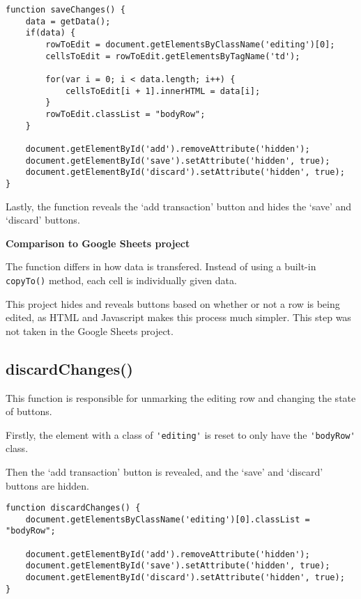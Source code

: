 \documentclass[letterpaper]{article}
\begin{document}
\begin{lstlisting}[firstnumber=197]
function saveChanges() {
    data = getData();
    if(data) {
        rowToEdit = document.getElementsByClassName('editing')[0];
        cellsToEdit = rowToEdit.getElementsByTagName('td');

        for(var i = 0; i < data.length; i++) {
            cellsToEdit[i + 1].innerHTML = data[i];
        }
        rowToEdit.classList = "bodyRow";
    }

    document.getElementById('add').removeAttribute('hidden');
    document.getElementById('save').setAttribute('hidden', true);
    document.getElementById('discard').setAttribute('hidden', true);
}
\end{lstlisting}

Lastly, the function reveals the `add transaction' button and hides the `save' and `discard' buttons.

\textbf{Comparison to Google Sheets project}

The function differs in how data is transfered.
Instead of using a built-in \lstinline{copyTo()} method, each cell is individually given data.

This project hides and reveals buttons based on whether or not a row is being edited, as HTML and Javascript makes this process much simpler.
This step was not taken in the Google Sheets project.

\subsection{discardChanges()}

This function is responsible for unmarking the editing row and changing the state of buttons.

Firstly, the element with a class of \lstinline{'editing'} is reset to only have the \lstinline{'bodyRow'} class.

Then the `add transaction' button is revealed, and the `save' and `discard' buttons are hidden.

\begin{lstlisting}[firstnumber=214]
function discardChanges() {
    document.getElementsByClassName('editing')[0].classList = "bodyRow";

    document.getElementById('add').removeAttribute('hidden');
    document.getElementById('save').setAttribute('hidden', true);
    document.getElementById('discard').setAttribute('hidden', true);
}
\end{lstlisting}
\end{document}
